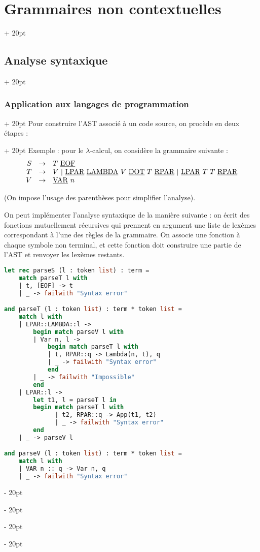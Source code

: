 \documentclass[a4paper, 12pt, twoside]{article}
\newcommand{\ind}[1][20pt]{\advance\leftskip + #1}
\newcommand{\deind}[1][20pt]{\advance\leftskip - #1}
\newenvironment{indt}[2][20pt]{#2 \par \ind[#1]}{\par \deind} %
\begin{document}
\begin{indt}{\section{Grammaires non contextuelles}}
\begin{indt}{\subsection{Analyse syntaxique}}
\begin{indt}{\subsubsection{Application aux langages de programmation}}
\begin{indt}{Pour construire l'AST associé à un code source, on procède en deux étapes :}
                    Exemple : pour le $\lambda$-calcul, on considère la grammaire suivante :
                    \[
                        \begin{array}{rcl}
                            S & \rightarrow & T\ \underbar{\rm{EOF}}
                            \\
                            T & \rightarrow & V\ |\ \underbar{\rm LPAR}\ \underbar{\rm LAMBDA}\ V\ \underbar{\rm DOT}\ T\ \underbar{\rm RPAR}\ |\ \underbar{\rm LPAR}\ T\ T\ \underbar{\rm RPAR}
                            \\
                            V & \rightarrow & \underline{\rm VAR}\ n
                        \end{array}
                    \]

                    (On impose l'usage des parenthèses pour simplifier l'analyse).

                    On peut implémenter l'analyse syntaxique de la manière suivante : on écrit des fonctions mutuellement récursives qui prennent en argument une liste de lexèmes correspondant  à l'une des règles de la grammaire.
                    On associe une fonction à chaque symbole non terminal, et cette fonction doit construire une partie de l'AST et renvoyer les lexèmes restants.

                    \begin{lstlisting}[language=Caml, xleftmargin=100pt]
let rec parseS (l : token list) : term =
    match parseT l with
    | t, [EOF] -> t
    | _ -> failwith "Syntax error"

and parseT (l : token list) : term * token list =
    match l with
    | LPAR::LAMBDA::l ->
        begin match parseV l with
        | Var n, l ->
            begin match parseT l with
            | t, RPAR::q -> Lambda(n, t), q
            | _ -> failwith "Syntax error"
            end
        | _ -> failwith "Impossible"
        end
    | LPAR::l ->
        let t1, l = parseT l in
        begin match parseT l with
              | t2, RPAR::q -> App(t1, t2)
              | _ -> failwith "Syntax error"
        end
    | _ -> parseV l

and parseV (l : token list) : term * token list =
    match l with
    | VAR n :: q -> Var n, q
    | _ -> failwith "Syntax error"\end{lstlisting}
                \end{indt}
            \end{indt}
        \end{indt}
    \end{indt}
    
\end{document}
